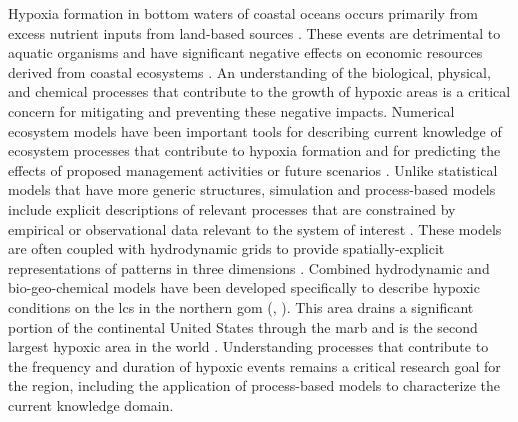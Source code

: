 \documentclass[letterpaper,12pt,oneside]{article}\usepackage[]{graphicx}\usepackage[]{color}
\begin{document}
Hypoxia formation in bottom waters of coastal oceans occurs primarily from excess nutrient inputs from land-based sources \citep{Justic87,Diaz95,Howarth96}.  These events are detrimental to aquatic organisms and have significant negative effects on economic resources derived from coastal ecosystems \citep{Lipton03,Diaz11}.  An understanding of the biological, physical, and chemical processes that contribute to the growth of hypoxic areas is a critical concern for mitigating and preventing these negative impacts.  Numerical ecosystem models have been important tools for describing current knowledge of ecosystem processes that contribute to hypoxia formation and for predicting the effects of proposed management activities or future scenarios \citep{Scavia04,Hagy07,Pauer16}.  Unlike statistical models that have more generic structures, simulation and process-based models include explicit descriptions of relevant processes that are constrained by empirical or observational data relevant to the system of interest \citep[e.g.][]{Omlin01b,Eldridge10}.  These models are often coupled with hydrodynamic grids to provide spatially-explicit representations of patterns in three dimensions \citep{Warner05,Zhao10,Ganju16}. Combined hydrodynamic and bio-geo-chemical models have been developed specifically to describe hypoxic conditions on the \ac{lcs} in the northern \ac{gom} (\citealt{Fennel13,Obenour15,Pauer16}, ).  This area drains a significant portion of the continental United States through the \ac{marb} and is the second largest hypoxic area in the world \citep{Rabalais02}.  Understanding processes that contribute to the frequency and duration of hypoxic events remains a critical research goal for the region, including the application of process-based models to characterize the current knowledge domain.  
\end{document}
